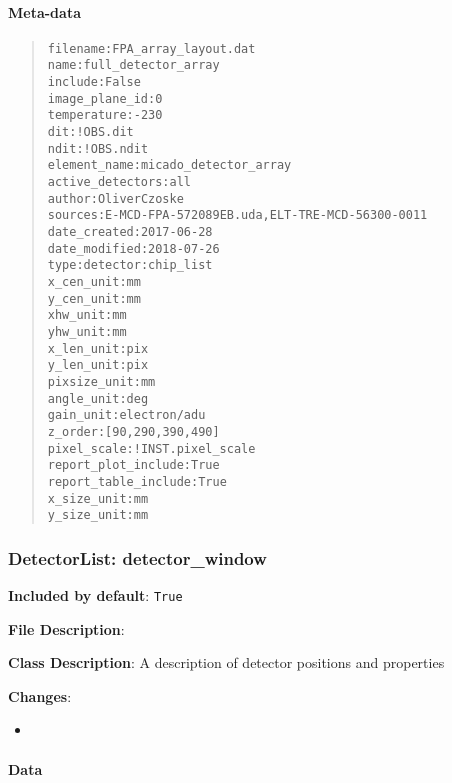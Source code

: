 \paragraph{Meta-data%
  \label{meta-data}%
}

\begin{quote}
\begin{alltt}
            filename : FPA_array_layout.dat
                name : full_detector_array
             include : False
      image_plane_id : 0
         temperature : -230
                 dit : !OBS.dit
                ndit : !OBS.ndit
        element_name : micado_detector_array
    active_detectors : all
              author : Oliver Czoske
             sources : E-MCD-FPA-572089EB.uda, ELT-TRE-MCD-56300-0011
        date_created : 2017-06-28
       date_modified : 2018-07-26
                type : detector:chip_list
          x_cen_unit : mm
          y_cen_unit : mm
            xhw_unit : mm
            yhw_unit : mm
          x_len_unit : pix
          y_len_unit : pix
        pixsize_unit : mm
          angle_unit : deg
           gain_unit : electron/adu
             z_order : [90, 290, 390, 490]
         pixel_scale : !INST.pixel_scale
 report_plot_include : True
report_table_include : True
         x_size_unit : mm
         y_size_unit : mm
\end{alltt}
\end{quote}


\subsubsection{DetectorList: \textquotedbl{}detector\_window\textquotedbl{}%
  \label{detectorlist-detector-window}%
}

\textbf{Included by default}: \texttt{True}

\textbf{File Description}:

\textbf{Class Description}: A description of detector positions and properties

\textbf{Changes}:

\begin{itemize}
\item \end{itemize}


\paragraph{Data%
  \label{id1}%
}

\begin{figure}
\noindent{}\label{fig-detector-window}
\end{figure}

